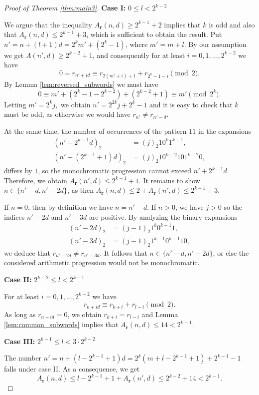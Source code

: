 \documentclass[a4paper,11pt]{amsart}
\theoremstyle{definition}
\begin{document}
\begin{proof}[Proof of Theorem \ref{thm:main3}]
\textbf{Case I:} $0 \leq l < 2^{k-2}$


We argue that the inequality $A_{\mathbf{r}}(n,d) \geq 2^{k-1} + 2$ implies that $k$ is odd and also that $A_{\mathbf{r}}(n,d) \leq 2^{k-1} + 3$, which is sufficient to obtain the result.
Put $n' = n+(l+1)d = 2^k m' + (2^k-1)$, where $m' = m+l$. By our assumption we get $A(n',d) \geq  2^{k-2} + 1$, and consequently for at least $i = 0,1,\ldots, 2^{k-2}$ we have 
$$ 0 = r_{n'+id} \equiv r_{2(m'+i)+1} + r_{2^k-1 - i} \pmod{2}. $$
By Lemma \ref{lem:reversed_subwords} we must have 
$$ 0 \equiv m' + (2^k-1-2^{k-2}) + (2^{k-2}+1) \equiv m' \pmod{2^{k}}.$$
Letting $m' = 2^k j,$ we obtain $n' = 2^{2k} j + 2^k-1$ and it is easy to check that $k$ must be odd, as otherwise we would have $r_{n'} \neq r_{n'-d}$. 

At the same time, the number of occurrences of the pattern $11$ in the expansions
\begin{align*}
(n' + 2^{k-1}d)_2 &= (j)_2 1 0^{k} 1^{k-1}, \\
(n' + (2^{k-1}+1)d)_2 &= (j)_2 1 0^{k-2} 10 1^{k-2} 0,
\end{align*}
differs by $1$, so the monochromatic progression cannot exceed $n' + 2^{k-1}d$. Therefore, we obtain $A_{\mathbf{r}}(n',d) \leq 2^{k-1} + 1$.  It remains to show $n \in \{n'-d, n'-2d\}$, as then $A_{\mathbf{r}}(n,d) \leq 2 + A_{\mathbf{r}}(n',d) \leq 2^{k-1} + 3$. 

If $n=0$, then by definition we have $n = n'-d$. If $n > 0$, we have $j > 0$ so the indices $n' - 2d$ and $n' - 3d$ are positive. By analyzing the binary expansions 
\begin{align*}
(n' - 2d)_2 &= (j-1)_2 1^k 0^{k-1} 1, \\
(n' - 3d)_2 &= (j-1)_2 1^{k-1} 0^{k-1} 1 0,
\end{align*}
we deduce that $r_{n' - 2d} \neq r_{n' - 3d}$. It follows that $n \in \{n'-d, n'-2d\}$, or else the considered arithmetic progression would not be monochromatic. 



\textbf{Case II:} $2^{k-2} \leq l < 2^{k-1}$

For at least $i = 0,1,\ldots, 2^{k-2}$ we have 
$$
r_{n+id} \equiv r_{k+i} + r_{l - i} \pmod{2}.
$$
As long as $r_{n+id}=0$, we obtain $r_{k+i} = r_{l - i}$ and Lemma \ref{lem:common_subwords} implies that $A_{\mathbf{r}}(n,d) \leq 14 < 2^{k-1}$.


\textbf{Case III:} $2^{k-1} \leq l < 3 \cdot 2^{k-2}$

The number $n' = n + (l-2^{k-1}+1)d = 2^k(m+l-2^{k-1}+1) + 2^{k-1} - 1$ falls under case II. As a consequence, we get 
$$A_{\mathbf{r}}(n,d) \leq l - 2^{k-1} + 1 + A_{\mathbf{r}}(n',d) \leq 2^{k-2} + 14 < 2^{k-1}.$$


\end{proof}
\end{document}
